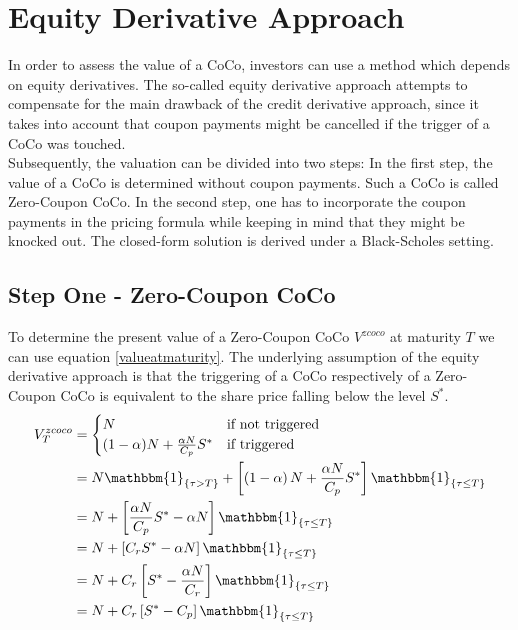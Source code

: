 \section{Equity Derivative Approach} \label{sec:equityderivativeapproach}

In order to assess the value of a CoCo, investors can use a method which depends on equity derivatives. \citep{de2011pricing, de2014handbook} The so-called equity derivative approach attempts to compensate for the main drawback of the credit derivative approach, since it takes into account that coupon payments might be cancelled if the trigger of a CoCo was touched.\\

Subsequently, the valuation can be divided into two steps: In the first step, the value of a CoCo is determined without coupon payments. Such a CoCo is called Zero-Coupon CoCo. In the second step, one has to incorporate the coupon payments in the pricing formula while keeping in mind that they might be knocked out. The closed-form solution is derived under a Black-Scholes setting.

\subsection{Step One - Zero-Coupon CoCo}

To determine the present value of a Zero-Coupon CoCo $V^{zcoco}$ at maturity $T$ we can use equation \ref{valueatmaturity}. The underlying assumption of the equity derivative approach is that the triggering of a CoCo respectively of a Zero-Coupon CoCo is equivalent to the share price falling below the level $S^*$. %
\begin{align} \label{pvedcoco}    
    V^{zcoco}_T &= \begin{cases} N & \text{if not triggered}\\ (1 - \alpha) N + \frac{\alpha N}{C_p} S^{*} & \text{if triggered} \end{cases} \nonumber\\
    &= N \mathbbm{1}_{\{ \tau > T \}} +\left[ \left( 1 - \alpha \right) N + \dfrac{\alpha N}{C_p } S^* \right] \mathbbm{1}_{\{ \tau \leq T \}}\nonumber\\
    &= N + \left[ \dfrac{\alpha N}{C_p} S^* - \alpha N \right] \mathbbm{1}_{\{ \tau \leq T \}}\nonumber\\
    &= N + \left[ C_r S^* - \alpha N \right] \mathbbm{1}_{\{ \tau \leq T \}}\nonumber\\
    &= N + C_r \left[S^* - \dfrac{\alpha N}{C_r}\right] \mathbbm{1}_{\{ \tau \leq T \}}\nonumber\\
    &= N + C_r \left[ S^* - C_p \right] \mathbbm{1}_{\{ \tau \leq T \}}
\end{align}

